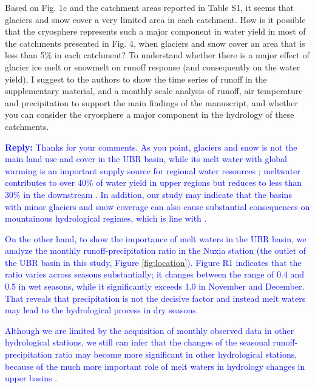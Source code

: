 \documentclass[11pt]{article}
\newcounter{reviewer}
\newcounter{point}[reviewer]
\renewcommand{\thepoint}{Comment\,\thereviewer.\arabic{point}:}
\newcommand{\point}[1]{\refstepcounter{point} \bigskip \noindent {\fontseries{b}\selectfont \thepoint} #1 \par}
\newcommand{\reply}[1]{\bigskip \textcolor{blue}{\noindent \textbf {Reply:} #1}}
\newcommand{\nextreply}[1]{\bigskip \textcolor{blue}{\noindent #1}}
\begin{document}
\point{Based on Fig. 1c and the catchment areas reported in Table S1, it seems that glaciers and snow cover a very limited area in each catchment. How is it possible that the cryosphere represents such a major component in water yield in most of the catchments presented in Fig. 4, when glaciers and snow cover an area that is less than 5\% in each catchment? 
To understand whether there is a major effect of glacier ice melt or snowmelt on runoff response (and consequently on the water yield), I suggest to the authors to show the time series of runoff in the supplementary material, and a monthly scale analysis of runoff, air temperature and precipitation to support the main findings of the manuscript, and whether you can consider the cryosphere a major component in the hydrology of these catchments.}
\reply{Thanks for your comments. As you point, glaciers and snow is not the main land use and cover in the UBR basin, while its melt water with global warming is an important supply source for regional water resources \citep{yao2019recent, wang2022observing}; meltwater contributes to over 40\% of water yield in upper regions but reduces to less than 30\% in the downstream \citep{biemans2019importance}. In addition, our study may indicate that the basins with minor glaciers and snow coverage can also cause substantial consequences on mountainous hydrological regimes, which is line with \citet{huss2018global}.} 

\nextreply{On the other hand, to show the importance of melt waters in the UBR basin, we analyze the monthly runoff-precipitation ratio in the Nuxia station (the outlet of the UBR basin in this study, Figure \ref{fig:location}). Figure R1 indicates that the ratio varies across seasons substantially; it changes between the range of 0.4 and 0.5 in wet seasons, while it significantly exceeds 1.0 in November and December. That reveals that precipitation is not the decisive factor and instead melt waters may lead to the hydrological process in dry seasons.}

\nextreply{Although we are limited by the acquisition of monthly observed data in other hydrological stations, we still can infer that the changes of the seasonal runoff-precipitation ratio may become more significant in other hydrological stations, because of the much more important role of melt waters in hydrology changes in upper basins \citep{biemans2019importance}.}
\end{document}
